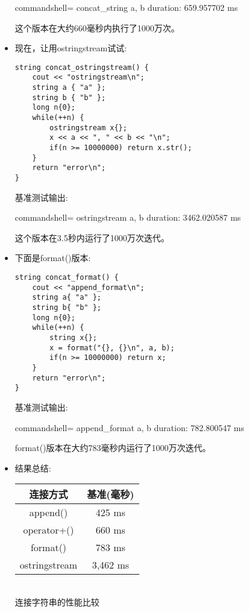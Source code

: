 \begin{itemize}
\begin{tcblisting}{commandshell={}}
concat_string
a, b
duration: 659.957702 ms
\end{tcblisting}

这个版本在大约660毫秒内执行了1000万次。

\item 
现在，让用ostringstream试试:

\begin{lstlisting}[style=styleCXX]
string concat_ostringstream() {
	cout << "ostringstream\n";
	string a { "a" };
	string b { "b" };
	long n{0};
	while(++n) {
		ostringstream x{};
		x << a << ", " << b << "\n";
		if(n >= 10000000) return x.str();
	}
	return "error\n";
}
\end{lstlisting}

基准测试输出:

\begin{tcblisting}{commandshell={}}
ostringstream
a, b
duration: 3462.020587 ms
\end{tcblisting}

这个版本在3.5秒内运行了1000万次迭代。

\item 
下面是format()版本:

\begin{lstlisting}[style=styleCXX]
string concat_format() {
	cout << "append_format\n";
	string a{ "a" };
	string b{ "b" };
	long n{0};
	while(++n) {
		string x{};
		x = format("{}, {}\n", a, b);
		if(n >= 10000000) return x;
	}
	return "error\n";
}
\end{lstlisting}

基准测试输出:

\begin{tcblisting}{commandshell={}}
append_format
a, b
duration: 782.800547 ms
\end{tcblisting}

format()版本在大约783毫秒内运行了1000万次迭代。

\item 
结果总结:

\begin{table}[H]
\centering
\begin{tabular}{|c|c|}
	\hline
	\rowcolor[HTML]{9B9B9B} 
	{\color[HTML]{FFFFFF} 连接方式} & {\color[HTML]{FFFFFF} 基准(毫秒)} \\ \hline
	append()      & 425 ms   \\ \hline
	operator+()   & 660 ms   \\ \hline
	format()      & 783 ms   \\ \hline
	ostringstream & 3,462 ms \\ \hline
\end{tabular}

\hspace*{\fill} \\ %
连接字符串的性能比较
\end{table}

\end{itemize}

